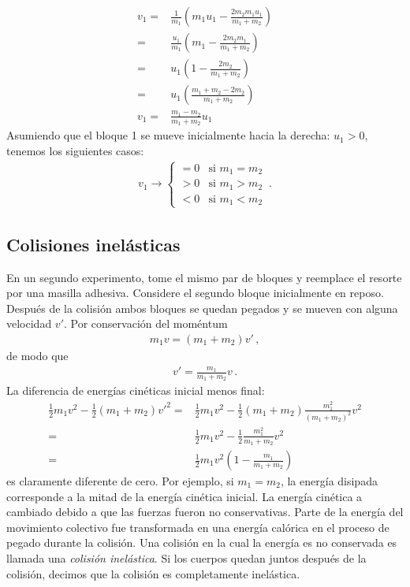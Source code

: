 \begin{align}
  v_1 =& \frac{1}{m_1}\left(m_1u_1 - \frac{2m_2 m_1u_1}{m_1+m_2} \right)\nonumber\\
  =& \frac{u_1}{m_1}\left(m_1 - \frac{2m_2 m_1}{m_1+m_2} \right)\nonumber\\
  =& u_1\left(1 - \frac{2m_2}{m_1+m_2} \right)\nonumber\\
  =& u_1\left(\frac{m_1+m_2 - 2m_2}{m_1+m_2} \right)\nonumber\\
  v_1 = &\frac{m_1 - m_2}{m_1 + m_2} u_1
\end{align}
Asumiendo que el bloque 1 se mueve inicialmente hacia la derecha: $u_1>0$,  tenemos los siguientes casos:
\begin{align}
  v_1\to
  \begin{cases}
    =0 & \text{si\ }m_1=m_2\\
    >0 & \text{si\ }m_1>m_2\\
    <0 & \text{si\ }m_1<m_2
  \end{cases}\,.
\end{align}
\finejemplo







\subsection{Colisiones inelásticas}
En un segundo experimento, tome el mismo par de bloques y reemplace el
resorte por una masilla adhesiva. Considere el segundo bloque
inicialmente en reposo. Después de la colisión ambos bloques se quedan
pegados y se mueven con alguna velocidad $v'$. Por conservación del
moméntum
\begin{align}
  m_1 v=(m_1+m_2)v'\,,
\end{align}
de modo que
\begin{align}
  v'=\frac{m_1}{m_1+m_2}v\,.
\end{align}
La diferencia de energías cinéticas inicial menos final:
\begin{align}
  \tfrac{1}{2}m_1v^2-\tfrac{1}{2}(m_1+m_2)v'^2=&
  \tfrac{1}{2}m_1v^2-\tfrac{1}{2}(m_1+m_2)\frac{m_1^2}{(m_1+m_2)^2}v^2\nonumber\\
  =&\tfrac{1}{2}m_1v^2-\tfrac{1}{2}\frac{m_1^2}{m_1+m_2}v^2\nonumber\\
  =&\tfrac{1}{2}m_1v^2  \left(1-\frac{m_1}{m_1+m_2} \right)
\end{align}
es claramente diferente de cero. Por ejemplo, si $m_1=m_2$, la energía
disipada corresponde a la mitad de la energía cinética inicial. La
energía cinética a cambiado debido a que las fuerzas fueron no
conservativas. Parte de la energía del movimiento colectivo fue
transformada en una energía calórica en el proceso de pegado durante
la colisión. Una colisión en la cual la energía es no conservada es
llamada una \emph{colisión inelástica}. Si los cuerpos quedan juntos
después de la colisión, decimos que la colisión es completamente
inelástica.



